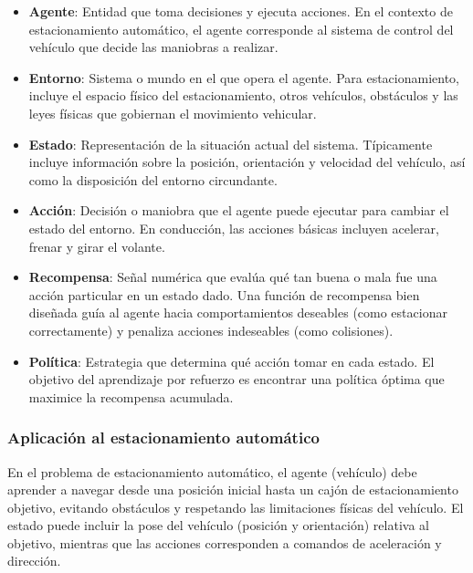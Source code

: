 \begin{itemize}
    \item \textbf{Agente}: Entidad que toma decisiones y ejecuta acciones. En el contexto de estacionamiento automático,
    el agente corresponde al sistema de control del vehículo que decide las maniobras a realizar.
    
    \item \textbf{Entorno}: Sistema o mundo en el que opera el agente. Para estacionamiento, incluye
    el espacio físico del estacionamiento, otros vehículos, obstáculos y las leyes físicas que gobiernan
    el movimiento vehicular.
    
    \item \textbf{Estado}: Representación de la situación actual del sistema. Típicamente incluye
    información sobre la posición, orientación y velocidad del vehículo, así como la disposición
    del entorno circundante.
    
    \item \textbf{Acción}: Decisión o maniobra que el agente puede ejecutar para cambiar el estado
    del entorno. En conducción, las acciones básicas incluyen acelerar, frenar y girar el volante.
    
    \item \textbf{Recompensa}: Señal numérica que evalúa qué tan buena o mala fue una acción particular
    en un estado dado. Una función de recompensa bien diseñada guía al agente hacia comportamientos deseables
    (como estacionar correctamente) y penaliza acciones indeseables (como colisiones).
    
    \item \textbf{Política}: Estrategia que determina qué acción tomar en cada estado. El objetivo
    del aprendizaje por refuerzo es encontrar una política óptima que maximice la recompensa acumulada.
\end{itemize}

\subsubsection{Aplicación al estacionamiento automático}\label{subsec:rl-parking}
\noindent
En el problema de estacionamiento automático, el agente (vehículo) debe aprender a navegar desde
una posición inicial hasta un cajón de estacionamiento objetivo, evitando obstáculos y respetando
las limitaciones físicas del vehículo. El estado puede incluir la pose del vehículo (posición y orientación)
relativa al objetivo, mientras que las acciones corresponden a comandos de aceleración y dirección.

